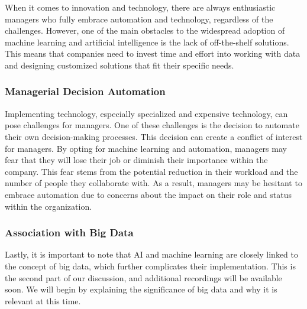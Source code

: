 When it comes to innovation and technology, there are always
enthusiastic managers who fully embrace automation and technology,
regardless of the challenges. However, one of the main obstacles to the
widespread adoption of machine learning and artificial intelligence is
the lack of off-the-shelf solutions. This means that companies need to
invest time and effort into working with data and designing customized
solutions that fit their specific needs.

\subsubsection{Managerial Decision Automation}

Implementing technology, especially specialized and expensive
technology, can pose challenges for managers. One of these challenges is
the decision to automate their own decision-making processes. This
decision can create a conflict of interest for managers. By opting for
machine learning and automation, managers may fear that they will lose
their job or diminish their importance within the company. This fear
stems from the potential reduction in their workload and the number of
people they collaborate with. As a result, managers may be hesitant to
embrace automation due to concerns about the impact on their role and
status within the organization.

\subsubsection{Association with Big Data}

Lastly, it is important to note that AI and machine learning are closely
linked to the concept of big data, which further complicates their
implementation. This is the second part of our discussion, and
additional recordings will be available soon. We will begin by
explaining the significance of big data and why it is relevant at this
time.